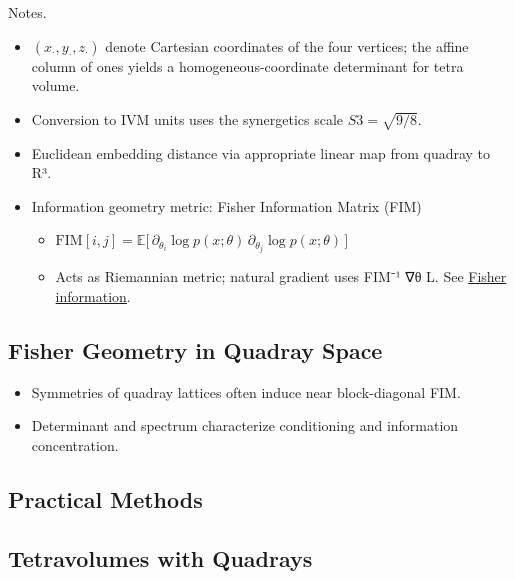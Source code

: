 \documentclass[
]{article}
\providecommand{\tightlist}{%
  \setlength{\itemsep}{0pt}\setlength{\parskip}{0pt}}
\begin{document}
Notes.

\begin{itemize}
\item
  \((x_\cdot,y_\cdot,z_\cdot)\) denote Cartesian coordinates of the four
  vertices; the affine column of ones yields a homogeneous-coordinate
  determinant for tetra volume.
\item
  Conversion to IVM units uses the synergetics scale \(S3=\sqrt{9/8}\).
\item
  Euclidean embedding distance via appropriate linear map from quadray
  to R³.
\item
  Information geometry metric: Fisher Information Matrix (FIM)

  \begin{itemize}
  \tightlist
  \item
    \(\mathrm{FIM}[i,j] = \mathbb{E}\big[\, \partial_{\theta_i} \log p(x;\theta)\,\partial_{\theta_j} \log p(x;\theta)\,\big]\)
  \item
    Acts as Riemannian metric; natural gradient uses FIM⁻¹ ∇θ L. See
    \href{https://en.wikipedia.org/wiki/Fisher_information}{Fisher
    information}.
  \end{itemize}
\end{itemize}

\hypertarget{fisher-geometry-in-quadray-space}{%
\subsection{Fisher Geometry in Quadray
Space}\label{fisher-geometry-in-quadray-space}}

\begin{itemize}
\tightlist
\item
  Symmetries of quadray lattices often induce near block-diagonal FIM.
\item
  Determinant and spectrum characterize conditioning and information
  concentration.
\end{itemize}

\hypertarget{practical-methods}{%
\subsection{Practical Methods}\label{practical-methods}}

\hypertarget{sec:tetravolumes_quadrays}{%
\subsection{Tetravolumes with
Quadrays}\label{sec:tetravolumes_quadrays}}
\end{document}
